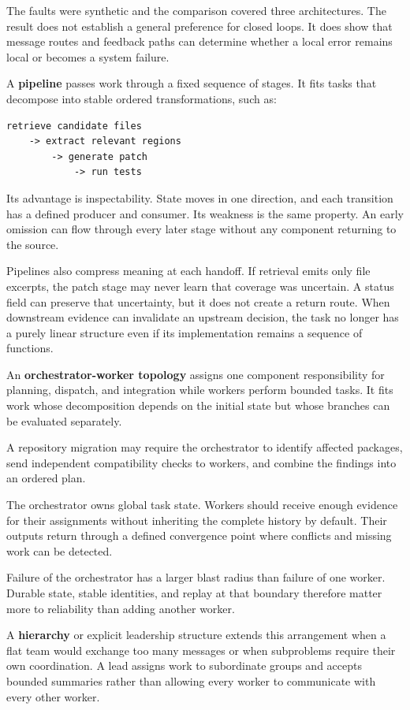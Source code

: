 The faults were synthetic and the comparison covered three architectures. The result does not establish a general preference for closed loops. It does show that message routes and feedback paths can determine whether a local error remains local or becomes a system failure.

A \textbf{pipeline} passes work through a fixed sequence of stages. It fits tasks that decompose into stable ordered transformations, such as:

\begin{verbatim}
retrieve candidate files
    -> extract relevant regions
        -> generate patch
            -> run tests
\end{verbatim}

Its advantage is inspectability. State moves in one direction, and each transition has a defined producer and consumer. Its weakness is the same property. An early omission can flow through every later stage without any component returning to the source.

Pipelines also compress meaning at each handoff. If retrieval emits only file excerpts, the patch stage may never learn that coverage was uncertain. A status field can preserve that uncertainty, but it does not create a return route. When downstream evidence can invalidate an upstream decision, the task no longer has a purely linear structure even if its implementation remains a sequence of functions.

An \textbf{orchestrator-worker topology} assigns one component responsibility for planning, dispatch, and integration while workers perform bounded tasks. It fits work whose decomposition depends on the initial state but whose branches can be evaluated separately.

A repository migration may require the orchestrator to identify affected packages, send independent compatibility checks to workers, and combine the findings into an ordered plan.

The orchestrator owns global task state. Workers should receive enough evidence for their assignments without inheriting the complete history by default. Their outputs return through a defined convergence point where conflicts and missing work can be detected.

Failure of the orchestrator has a larger blast radius than failure of one worker. Durable state, stable identities, and replay at that boundary therefore matter more to reliability than adding another worker.

A \textbf{hierarchy} or explicit leadership structure extends this arrangement when a flat team would exchange too many messages or when subproblems require their own coordination. A lead assigns work to subordinate groups and accepts bounded summaries rather than allowing every worker to communicate with every other worker.

